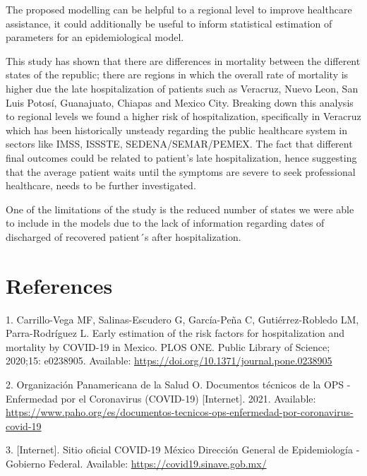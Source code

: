 \documentclass[10pt,letterpaper]{article}
\begin{document}
The proposed modelling can be helpful to a regional level to improve
healthcare assistance, it could additionally be useful to inform
statistical estimation of parameters for an epidemiological model.

This study has shown that there are differences in mortality between the
different states of the republic; there are regions in which the overall
rate of mortality is higher due the late hospitalization of patients
such as Veracruz, Nuevo Leon, San Luis Potosí, Guanajuato, Chiapas and
Mexico City. Breaking down this analysis to regional levels we found a
higher risk of hospitalization, specifically in Veracruz which has been
historically unsteady regarding the public healthcare system in sectors
like IMSS, ISSSTE, SEDENA/SEMAR/PEMEX. The fact that different final
outcomes could be related to patient's late hospitalization, hence
suggesting that the average patient waits until the symptoms are severe
to seek professional healthcare, needs to be further investigated.

One of the limitations of the study is the reduced number of states we
were able to include in the models due to the lack of information
regarding dates of discharged of recovered patient´s after
hospitalization.

\hypertarget{references}{%
\section*{References}\label{references}}

\hypertarget{refs}{}
\leavevmode\hypertarget{ref-Carrillo-Vega2020}{}%
1. Carrillo-Vega MF, Salinas-Escudero G, García-Peña C,
Gutiérrez-Robledo LM, Parra-Rodríguez L. Early estimation of the risk
factors for hospitalization and mortality by COVID-19 in Mexico. PLOS
ONE. Public Library of Science; 2020;15: e0238905. Available:
\url{https://doi.org/10.1371/journal.pone.0238905}

\leavevmode\hypertarget{ref-OrganizacionPanamericanadelaSalud2021}{}%
2. Organización Panamericana de la Salud O. Documentos técnicos de la
OPS - Enfermedad por el Coronavirus (COVID-19) {[}Internet{]}. 2021.
Available:
\url{https://www.paho.org/es/documentos-tecnicos-ops-enfermedad-por-coronavirus-covid-19}

\leavevmode\hypertarget{ref-covidgob}{}%
3. {[}Internet{]}. Sitio oficial COVID-19 México Dirección General de
Epidemiología - Gobierno Federal. Available:
\url{https://covid19.sinave.gob.mx/}
\end{document}
